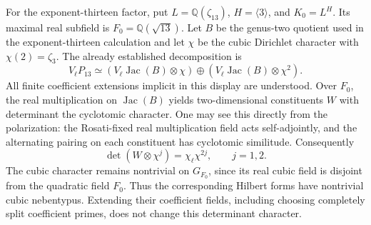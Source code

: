 For the exponent-thirteen factor, put
$L=\mathbb Q(\zeta_{13})$, $H=\langle3\rangle$, and
$K_0=L^H$.  Its maximal real subfield is
$F_0=\mathbb Q(\sqrt{13})$.
Let $B$ be the genus-two quotient used in the exponent-thirteen
calculation and let $\chi$ be the cubic Dirichlet character
with $\chi(2)=\zeta_3$.  The already established decomposition is
\[
 V_\ell P_{13}\simeq
 (V_\ell\operatorname{Jac}(B)\otimes\chi)
 \oplus
 (V_\ell\operatorname{Jac}(B)\otimes\chi^2).
\]
All finite coefficient extensions implicit in this display are
understood.  Over $F_0$, the real multiplication on
$\operatorname{Jac}(B)$ yields two-dimensional constituents
$W$ with determinant the cyclotomic character.  One may see this
directly from the polarization: the Rosati-fixed real
multiplication field acts self-adjointly, and the alternating
pairing on each constituent has cyclotomic similitude.
Consequently
\[
 \det(W\otimes\chi^j)=\chi_{\ell}\chi^{2j},
 \qquad j=1,2.
\]
The cubic character remains nontrivial on $G_{F_0}$, since its
real cubic field is disjoint from the quadratic field $F_0$.
Thus the corresponding Hilbert forms have nontrivial cubic
nebentypus.  Extending their coefficient fields, including
choosing completely split coefficient primes, does not change
this determinant character.


